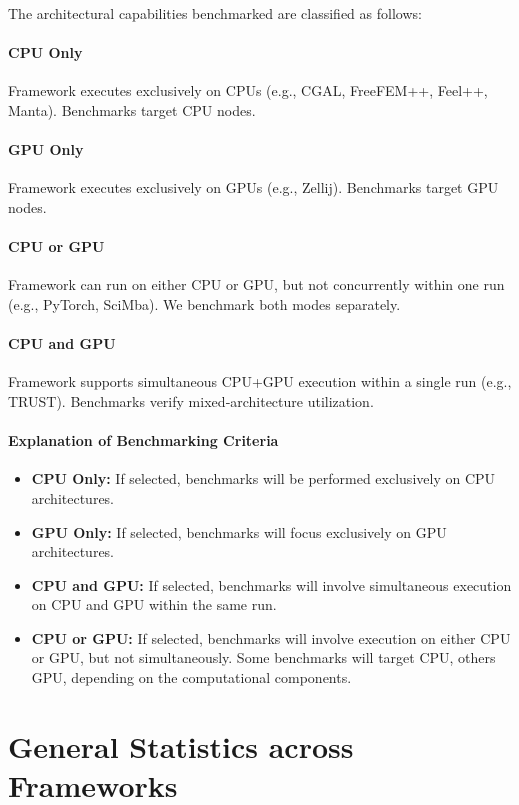 The architectural capabilities benchmarked are classified as follows:

\paragraph{CPU Only}
Framework executes exclusively on CPUs (e.g., CGAL, FreeFEM++, Feel++, Manta). Benchmarks target CPU nodes.

\paragraph{GPU Only}
Framework executes exclusively on GPUs (e.g., Zellij). Benchmarks target GPU nodes.

\paragraph{CPU or GPU}
Framework can run on either CPU or GPU, but not concurrently within one run (e.g., PyTorch, SciMba). We benchmark both modes separately.

\paragraph{CPU and GPU}
Framework supports simultaneous CPU+GPU execution within a single run (e.g., TRUST). Benchmarks verify mixed‑architecture utilization.

\paragraph{Explanation of Benchmarking Criteria}
\begin{itemize}
    \item \textbf{CPU Only:} If selected, benchmarks will be performed exclusively on CPU architectures.
    \item \textbf{GPU Only:} If selected, benchmarks will focus exclusively on GPU architectures.
    \item \textbf{CPU and GPU:} If selected, benchmarks will involve simultaneous execution on CPU and GPU within the same run.
    \item \textbf{CPU or GPU:} If selected, benchmarks will involve execution on either CPU or GPU, but not simultaneously. Some benchmarks will target CPU, others GPU, depending on the computational components.
\end{itemize}


\section{General Statistics across Frameworks}
\label{sec:software:statistics}

